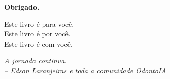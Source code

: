 \vspace{1cm}

\begin{center}
\begin{mdframed}[
  linecolor=corPrimaria,
  linewidth=3pt,
  backgroundcolor=corPrimaria!5,
  roundcorner=4pt,
  innertopmargin=15pt,
  innerbottommargin=15pt
]
  \Large\textbf{\textcolor{corPrimaria}{Obrigado.}}

  \bigskip

  \normalsize
  Este livro é para você. \\
  Este livro é por você. \\
  Este livro é com você.

  \bigskip

  \textit{A jornada continua.} \\
  \textit{-- Edson Laranjeiras e toda a comunidade OdontoIA}
\end{mdframed}
\end{center}

\endinput
